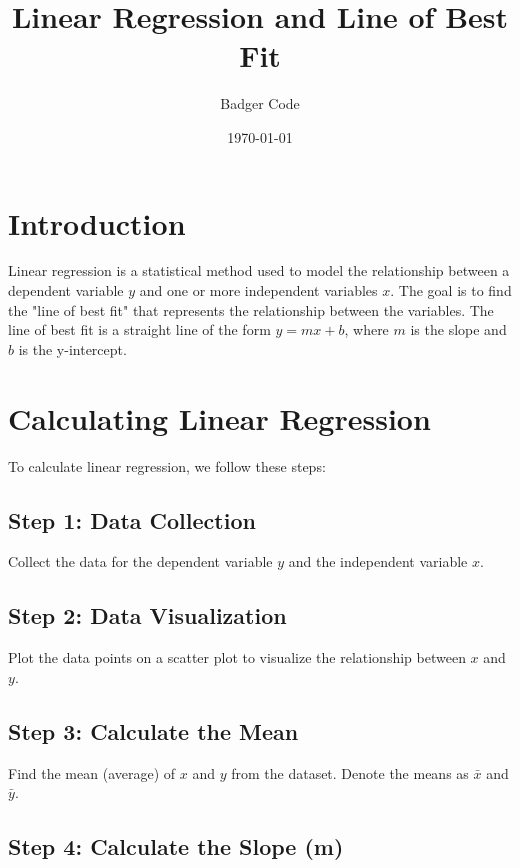 \documentclass{article}
\begin{document}
\title{Linear Regression and Line of Best Fit}
\author{Badger Code}
\date{\today}
\maketitle

\section{Introduction}

Linear regression is a statistical method used to model the relationship between a dependent variable $y$ and one or more independent variables $x$. The goal is to find the "line of best fit" that represents the relationship between the variables. The line of best fit is a straight line of the form $y = mx + b$, where $m$ is the slope and $b$ is the y-intercept.

\section{Calculating Linear Regression}

To calculate linear regression, we follow these steps:

\subsection{Step 1: Data Collection}

Collect the data for the dependent variable $y$ and the independent variable $x$.

\subsection{Step 2: Data Visualization}

Plot the data points on a scatter plot to visualize the relationship between $x$ and $y$.

\subsection{Step 3: Calculate the Mean}

Find the mean (average) of $x$ and $y$ from the dataset. Denote the means as $\bar{x}$ and $\bar{y}$.

\subsection{Step 4: Calculate the Slope (m)}
\end{document}
